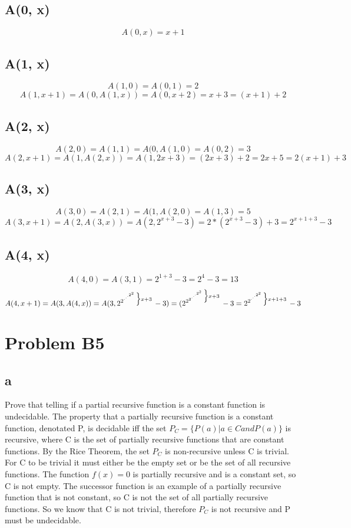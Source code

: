 \documentclass[12pt]{article}
\begin{document}
\subsection*{A(0, x)} 
$$A(0, x) = x + 1$$
\subsection*{A(1, x)}
$$A(1, 0) = A(0, 1) = 2$$
$$A(1, x + 1) = A(0, A(1, x)) = A(0, x + 2) = x + 3 = (x + 1) +2$$
\subsection*{A(2, x)} 
$$A(2, 0) = A(1, 1) = A(0, A(1, 0) = A(0, 2) = 3$$
$$A(2, x + 1) = A(1, A(2, x)) = A(1, 2x + 3) = (2x + 3) +2 = 2x + 5 = 2(x + 1) + 3$$
\subsection*{A(3, x)} 
$$A(3, 0) = A(2, 1) = A(1, A(2, 0) = A(1, 3) = 5$$
$$A(3, x + 1) = A(2, A(3, x)) = A(2, 2^{x + 3} - 3) = 2*(2^{x+3} - 3)  + 3 = 2^{x + 1 + 3} - 3$$
\subsection*{A(4, x)} 
$$A(4, 0) = A(3, 1) = 2^{1 + 3} - 3 = 2^4 -3 = 13$$
$$A(4, x + 1) = A(3, A(4, x)) = A(3,  \supexpo{2}{2}{x + 3}\> - 3) = (2^{\supexpo{2}{2}{x + 3}\>} - 3 = \supexpo{2}{2}{x + 1 + 3}\> - 3$$

\section*{Problem B5}
\subsection*{a}
Prove that telling if a partial recursive function is a constant function is undecidable.  The property that a partially recursive function is a constant function, denotated P, is decidable iff the set $P_C = \{P(a)|a \in C and P(a)\}$ is recursive, where C is the set of partially recursive functions that are constant functions. By the Rice Theorem, the set $P_C$ is non-recursive unless C is trivial.  For C to be trivial it must either be the empty set or be the set of all recursive functions. The function $f(x)=0$ is partially recursive and is a constant set, so C is not empty.  The successor function is an example of a partially recursive function that is not constant, so C is not the set of all partially recursive functions.  So we know that C is not trivial, therefore $P_C$ is not recursive and P must be undecidable. 
\end{document}
